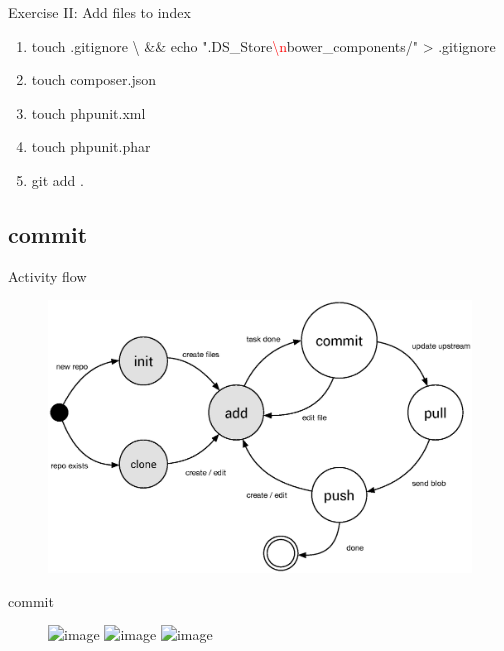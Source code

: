 \documentclass{beamer}
\begin{document}
\begin{frame}{Exercise II: Add files to index}
    \begin{enumerate}[\$]
        \item<1->touch .gitignore {\textbackslash} \newline
            \&\& echo ".DS\_Store{\textcolor{red}{{\textbackslash}n}}bower\_components/" > .gitignore
        \item<3-> touch composer.json
        \item<3-> touch phpunit.xml
        \item<3-> touch phpunit.phar
        \item<4-> git add .
    \end{enumerate}
    
\end{frame}

\subsection[commit]{commit}
\begin{frame}{Activity flow}
    \begin{figure}
        \center
        \includegraphics[width=.9\textwidth]{git-command-flow-2}
        \label{fig:git-command-flow-2}
    \end{figure}
\end{frame}

\begin{frame}{commit}
    \begin{figure}
        \center
        \includegraphics<1>[width=.8\textwidth]{project-changed-0}
        \includegraphics<2>[width=.8\textwidth]{project-changed-1}
        \includegraphics<3>[width=.8\textwidth]{project-changed-2}
        \label{fig:project-changed-2}
    \end{figure}
\end{frame}
\end{document}
